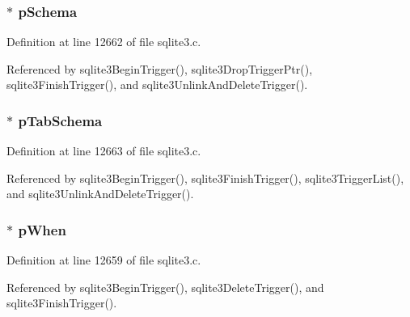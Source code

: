 \hypertarget{struct_trigger_ac262c2ca980f0326edbe82bbe7fda205}{}
\subsubsection[{p\+Schema}]{$\ast$ p\+Schema}\label{struct_trigger_ac262c2ca980f0326edbe82bbe7fda205}


Definition at line 12662 of file sqlite3.\+c.



Referenced by sqlite3\+Begin\+Trigger(), sqlite3\+Drop\+Trigger\+Ptr(), sqlite3\+Finish\+Trigger(), and sqlite3\+Unlink\+And\+Delete\+Trigger().

\hypertarget{struct_trigger_a55c2d533138b9f0d4ff75efd6423c1b4}{}
\subsubsection[{p\+Tab\+Schema}]{$\ast$ p\+Tab\+Schema}\label{struct_trigger_a55c2d533138b9f0d4ff75efd6423c1b4}


Definition at line 12663 of file sqlite3.\+c.



Referenced by sqlite3\+Begin\+Trigger(), sqlite3\+Finish\+Trigger(), sqlite3\+Trigger\+List(), and sqlite3\+Unlink\+And\+Delete\+Trigger().

\hypertarget{struct_trigger_ab548cb17db3157472b7bcedf090a51e1}{}
\subsubsection[{p\+When}]{$\ast$ p\+When}\label{struct_trigger_ab548cb17db3157472b7bcedf090a51e1}


Definition at line 12659 of file sqlite3.\+c.



Referenced by sqlite3\+Begin\+Trigger(), sqlite3\+Delete\+Trigger(), and sqlite3\+Finish\+Trigger().

\hypertarget{struct_trigger_a1864547b78df5071eee17260d8dd5631}{}
